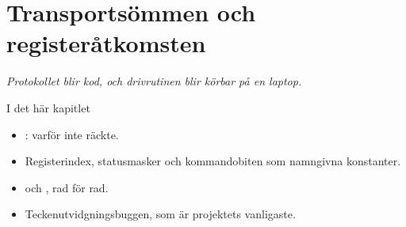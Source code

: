 \chapter{Transportsömmen och registeråtkomsten}
\label{ch:byte}


{\large\itshape Protokollet blir kod, och drivrutinen blir körbar på en laptop.\par}

\begin{chapterbox}{I det här kapitlet}
\begin{itemize}
  \item {}: varför  inte räckte.
  \item Registerindex, statusmasker och kommandobiten som namngivna konstanter.
  \item {} och , rad för rad.
  \item Teckenutvidgningsbuggen, som är projektets vanligaste.
\end{itemize}
\end{chapterbox}




